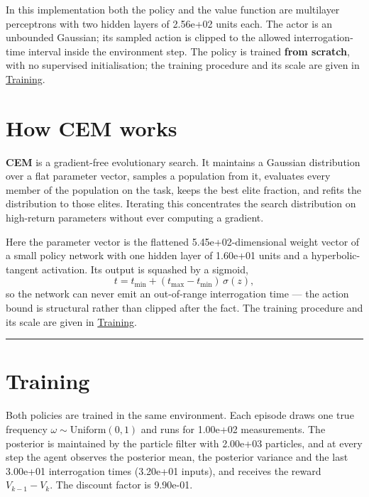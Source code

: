 \documentclass[12pt,a4paper]{article}
\begin{document}
In this implementation both the policy and the value function are
multilayer perceptrons with two hidden layers of 2.56e+02 units each. The
actor is an unbounded Gaussian; its sampled action is clipped to the allowed
interrogation-time interval inside the environment step. The policy is
trained \textbf{from scratch}, with no supervised initialisation; the
training procedure and its scale are given in
\hyperref[sec:training]{Training}.

\section{How CEM works}
\label{sec:cem}
\textbf{CEM} is a gradient-free evolutionary search. It maintains a Gaussian
distribution over a flat parameter vector, samples a population from it,
evaluates every member of the population on the task, keeps the best elite
fraction, and refits the distribution to those elites. Iterating this
concentrates the search distribution on high-return parameters without ever
computing a gradient.

Here the parameter vector is the flattened 5.45e+02-dimensional weight
vector of a small policy network with one hidden layer of 1.60e+01 units and
a hyperbolic-tangent activation. Its output is squashed by a sigmoid,
\begin{equation}
  t = t_{\min} + (t_{\max} - t_{\min})\,\sigma(z),
  \label{eq:cem-output}
\end{equation}
so the network can never emit an out-of-range interrogation time --- the
action bound is structural rather than clipped after the fact. The training
procedure and its scale are given in
\hyperref[sec:training]{Training}.

\noindent\rule{\textwidth}{0.4pt}
\FloatBarrier

\section{Training}
\label{sec:training}
Both policies are trained in the same environment. Each episode draws one
true frequency $\omega \sim \mathrm{Uniform}(0, 1)$ and runs for
1.00e+02 measurements. The posterior is maintained by the particle filter
with 2.00e+03 particles, and at every step the agent observes the posterior
mean, the posterior variance and the last 3.00e+01 interrogation times
(3.20e+01 inputs), and receives the reward $V_{k-1} - V_k$. The discount
factor is 9.90e-01.
\end{document}
